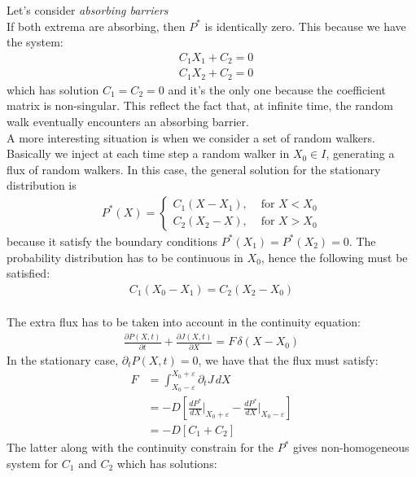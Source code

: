 \documentclass[4apaper,11pt,fleqn]{article}
\theoremstyle{remark}
\theoremstyle{definition}
\begin{document}
Let's consider \emph{absorbing barriers}\\
If both extrema are absorbing, then $P^*$ is identically zero. This because we have the system:
\begin{align*}
  &C_1 X_1 + C_2 = 0 \\
  &C_1 X_2 + C_2 = 0
\end{align*}
which has solution $C_1 = C_2 = 0$ and it's the only one because the coefficient matrix is non-singular. This reflect the fact that, at infinite time, the random walk eventually encounters an absorbing barrier. \\
A more interesting situation is when we consider a set of random walkers. Basically we inject at each time step a random walker in $X_0 \in I$, generating a flux of random walkers.
In this case, the general solution for the stationary distribution is
\begin{align*}
  P^{*}(X)=\left\{\begin{array}{ll}{C_{1}\left(X-X_{1}\right),} & {\text { for } X<X_{0}} \\
  {C_{2}\left(X_{2}-X\right),} & {\text { for } X>X_{0}}\end{array}\right. %
\end{align*}
because it satisfy the boundary conditions $P^*(X_1)=P^*(X_2)=0$. The probability distribution has to be continuous in $X_0$, hence the following must be satisfied:
\begin{align*}
  C_{1}\left(X_{0}-X_{1}\right)=C_{2}\left(X_{2}-X_{0}\right)
\end{align*}\\
The extra flux has to be taken into account in the continuity equation:
\begin{align*}
  \frac{\partial P(X, t)}{\partial t}+\frac{\partial J(X, t)}{\partial X}= F \, \delta (X - X_0)
\end{align*}
In the stationary case, $\partial_t P(X,t) = 0$, we have that the flux must satisfy:
\begin{align*}
  F &= \int_{X_0 - \varepsilon}^{X_0 + \varepsilon} \partial_t J \, dX  \\
    &= -D \left[ \frac{d P^*}{dX}\Bigr|_{X_0 + \varepsilon} - \frac{d P^*}{dX}\Bigr|_{X_0 - \varepsilon} \right] \\
    &= -D [C_1 + C_2]
\end{align*}
The latter along with the continuity constrain for the $P^*$ gives non-homogeneous system for $C_1$ and $C_2$ which has solutions:
\end{document}
